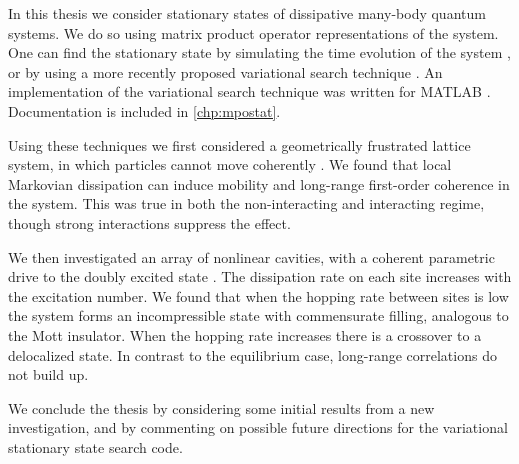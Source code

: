 In this thesis we consider stationary states of dissipative many-body quantum systems. We do so using matrix product operator representations of the system. One can find the stationary state by simulating the time evolution of the system \cite{Vidal2004,Schollwock2011}, or by using a more recently proposed variational search technique \cite{Cui2015,Mascarenhas2015}. An implementation of the variational search technique was written for MATLAB \cite{otb:gitVSSS,MATLAB}. Documentation is included in \cref{chp:mpostat}.

Using these techniques we first considered a geometrically frustrated lattice system, in which particles cannot move coherently \cite{Owen2017}. We found that local Markovian dissipation can induce mobility and long-range first-order coherence in the system. This was true in both the non-interacting and interacting regime, though strong interactions suppress the effect.

We then investigated an array of nonlinear cavities, with a coherent parametric drive to the doubly excited state \cite{Brown2018}. The dissipation rate on each site increases with the excitation number. We found that when the hopping rate between sites is low the system forms an incompressible state with commensurate filling, analogous to the Mott insulator. When the hopping rate increases there is a crossover to a delocalized state. In contrast to the equilibrium case, long-range correlations do not build up.

We conclude the thesis by considering some initial results from a new investigation, and by commenting on possible future directions for the variational stationary state search code.